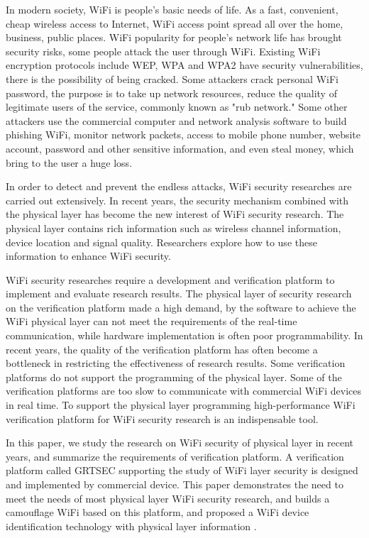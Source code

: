 \begin{eabstract}
	In modern society, WiFi is people's basic needs of life.
	As a fast, convenient, cheap wireless access to Internet, WiFi access point spread all over the home, business, public places.
	WiFi popularity for people's network life has brought security risks, some people attack the user through WiFi.
	Existing WiFi encryption protocols include WEP, WPA and WPA2 have security vulnerabilities, there is the possibility of being cracked.
	Some attackers crack personal WiFi password, the purpose is to take up network resources,
	reduce the quality of legitimate users of the service, commonly known as "rub network."
	Some other attackers use the commercial computer and network analysis software to build phishing WiFi,
	monitor network packets, access to mobile phone number, website account, password and other sensitive information,
	and even steal money, which bring to the user a huge loss.

	In order to detect and prevent the endless attacks, WiFi security researches are carried out extensively.
	In recent years, the security mechanism combined with the physical layer has become the new interest of WiFi security research.
	The physical layer contains rich information such as wireless channel information, device location and signal quality.
	Researchers explore how to use these information to enhance WiFi security.

	WiFi security researches require a development and verification platform to implement and evaluate research results.
	The physical layer of security research on the verification platform made a high demand,
	by the software to achieve the WiFi physical layer can not meet the requirements of the real-time communication,
	while hardware implementation is often poor programmability.
	In recent years, the quality of the verification platform has often become a bottleneck in restricting the effectiveness of research results.
	Some verification platforms do not support the programming of the physical layer.
	Some of the verification platforms are too slow to communicate with commercial WiFi devices in real time.
	To support the physical layer programming high-performance WiFi verification platform for WiFi security research is an indispensable tool.

	In this paper, we study the research on WiFi security of physical layer in recent years,
	and summarize the requirements of verification platform.
	A verification platform called GRTSEC supporting the study of WiFi layer security is designed and implemented by commercial device.
	This paper demonstrates the need to meet the needs of most physical layer WiFi security research,
	and builds a camouflage WiFi based on this platform, and proposed a WiFi device identification technology with physical layer information .

\end{eabstract}
